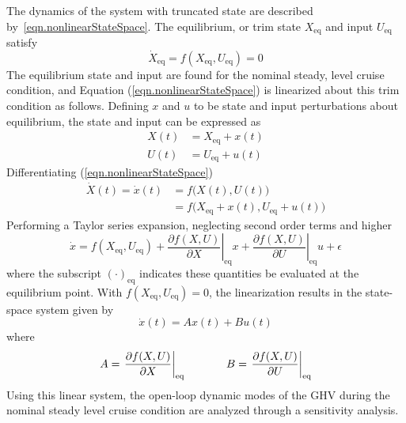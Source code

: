 The dynamics of the system with truncated state are described by\ \eqref{eqn.nonlinearStateSpace}.
The equilibrium, or trim state $X_{\text{eq}}$ and input $U_{\text{eq}}$ satisfy
\begin{equation}
  \label{eqn.eqptdef}
  \dot{X}_{\text{eq}}=f({X}_{\text{eq}},U_{\text{eq}})=0
\end{equation}
The equilibrium state and input are found for the nominal steady, level cruise condition, and Equation (\ref{eqn.nonlinearStateSpace}) is linearized about this trim condition as follows.
Defining $x$ and $u$ to be state and input perturbations about equilibrium, the state and input can be expressed as
\begin{equation*}
  \begin{split}
    X(t) &= X_{\text{eq}} + x(t) \\
    U(t) &= U_{\text{eq}} + u(t)
  \end{split}
\end{equation*}
Differentiating (\ref{eqn.nonlinearStateSpace})
\begin{equation}
  \label{eqn.Xdotxdotfxu}
  \begin{split}
    \dot{X}(t) = \dot{x}(t)
    &= f\bigr(X(t), U(t)\bigr) \\
    &= f\bigr(X_{\text{eq}}+x(t),U_{\text{eq}}+u(t)\bigr)
  \end{split}
\end{equation}
Performing a Taylor series expansion, neglecting second order terms and higher
\begin{equation}
  \label{eqn.TaylorSeriesExpansionNonlinearEqn}
  \dot{x}= f(X_{\text{eq}},U_{\text{eq}})+\left.\frac{\partial f(X,U)}{\partial X}\right|_{\text{eq}}x+\left.\frac{\partial f(X,U)}{\partial U}\right|_{\text{eq}}u+\epsilon
\end{equation}
where the subscript $(\cdot)_{\text{eq}}$ indicates these quantities be evaluated at the equilibrium point.
With $f(X_{\text{eq}},U_{\text{eq}})=0$, the linearization results in the state-space system given by
\begin{equation}
  \label{eqn.linearStateSpace}
  \dot{x}(t) = Ax(t) + Bu(t)
\end{equation}
where
\begin{equation*}
  A = \left.\frac{\partial f(X,U)}{\partial X}\right|_{\text{eq}}^{}
  \hspace{0.5in}
  B = \left.\frac{\partial f(X,U)}{\partial U}\right|_{\text{eq}}^{}
\end{equation*}
Using this linear system, the open-loop dynamic modes of the GHV during the nominal steady level cruise condition are analyzed through a sensitivity analysis.
